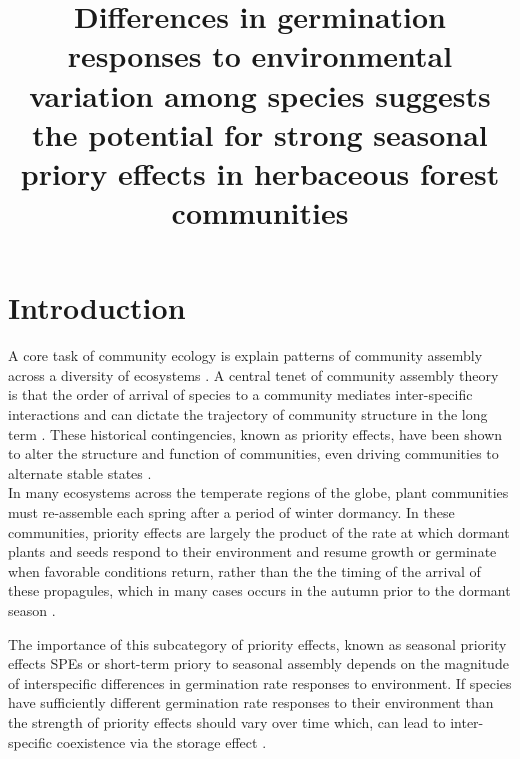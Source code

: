 \documentclass[11pt]{article}\usepackage[]{graphicx}\usepackage[]{color}
\title{Differences in germination responses to environmental variation among species suggests the potential for strong seasonal priory effects in herbaceous forest communities}
\date{}
\author{}
\begin{document}
\maketitle
\linenumbers
\section{Introduction}

\noindent A core task of community ecology is explain patterns of community assembly across a diversity of ecosystems \citep{Weiher:2011aa}. A central tenet of community assembly theory is that the order of arrival of species to a community mediates inter-specific interactions and can dictate the trajectory of community structure in the long term \citep{Fukami2015}. These historical contingencies, known as priority effects, have been shown to alter the structure and function of communities, even driving communities to alternate stable states \citep{Fukami2011}.\\

\noindent In many ecosystems across the temperate regions of the globe, plant communities must re-assemble each spring after a period of winter dormancy. In these communities, priority effects are largely the product of the rate at which dormant plants and seeds respond to their environment and resume growth or germinate when favorable conditions return\citep{Rudolf:2019aa}, rather than the the timing of the arrival of these propagules, which in many cases occurs in the autumn prior to the dormant season \citep{Howe:1982aa,Baskin:1988aa}.

\noindent%
The importance of this subcategory of priority effects, known as seasonal priority effects SPEs \citep{Wainwright_2011} or short-term priory \citep{Young:2017aa} to seasonal assembly depends on the magnitude of interspecific differences in germination rate responses to environment. If species have sufficiently different germination rate responses to their environment than the strength of priority effects should vary over time which, can lead to inter-specific coexistence via the storage effect \citep{Towers:2020aa}.\\%
\end{document}
